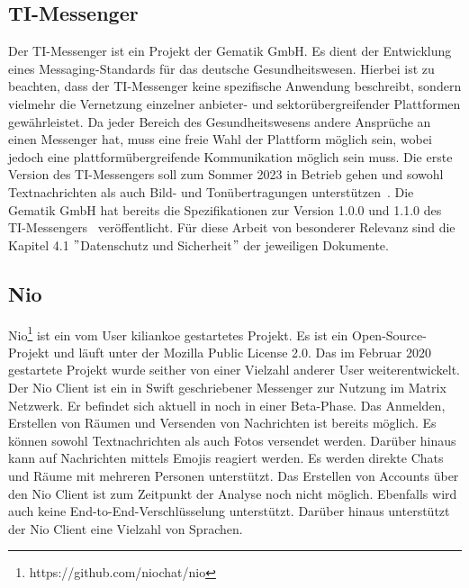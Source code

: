     \subsection{TI-Messenger}\label{subsec:ti-messenger}
    Der TI-Messenger ist ein Projekt der Gematik GmbH.
    Es dient der Entwicklung eines Messaging-Standards für das deutsche Gesundheitswesen.
    Hierbei ist zu beachten, dass der TI-Messenger keine spezifische Anwendung beschreibt, sondern vielmehr die Vernetzung einzelner anbieter- und sektorübergreifender Plattformen gewährleistet.
    Da jeder Bereich des Gesundheitswesens andere Ansprüche an einen Messenger hat, muss eine freie Wahl der Plattform möglich sein, wobei jedoch eine plattformübergreifende Kommunikation möglich sein muss.
    Die erste Version des TI-Messengers soll zum Sommer 2023 in Betrieb gehen und sowohl Textnachrichten als auch Bild- und Tonübertragungen unterstützen~\cite{timessenger,timessenger2}.
    Die Gematik GmbH hat bereits die Spezifikationen zur Version 1.0.0 und 1.1.0 des TI-Messengers~\cite{timessenger3} veröffentlicht.
    Für diese Arbeit von besonderer Relevanz sind die Kapitel 4.1 \("\)Datenschutz und Sicherheit\("\) der jeweiligen Dokumente.

    \subsection{Nio}
    Nio\footnote{https://github.com/niochat/nio} ist ein vom User kiliankoe gestartetes Projekt.
    Es ist ein Open-Source-Projekt und läuft unter der Mozilla Public License 2.0.
    Das im Februar 2020 gestartete Projekt wurde seither von einer Vielzahl anderer User weiterentwickelt.
    Der Nio Client ist ein in Swift geschriebener Messenger zur Nutzung im Matrix Netzwerk.
    Er befindet sich aktuell in noch in einer Beta-Phase.
    Das Anmelden, Erstellen von Räumen und Versenden von Nachrichten ist bereits möglich.
    Es können sowohl Textnachrichten als auch Fotos versendet werden.
    Darüber hinaus kann auf Nachrichten mittels Emojis reagiert werden.
    Es werden direkte Chats und Räume mit mehreren Personen unterstützt.
    Das Erstellen von Accounts über den Nio Client ist zum Zeitpunkt der Analyse noch nicht möglich.
    Ebenfalls wird auch keine End-to-End-Verschlüsselung unterstützt.
    Darüber hinaus unterstützt der Nio Client eine Vielzahl von Sprachen.

    \newpage
